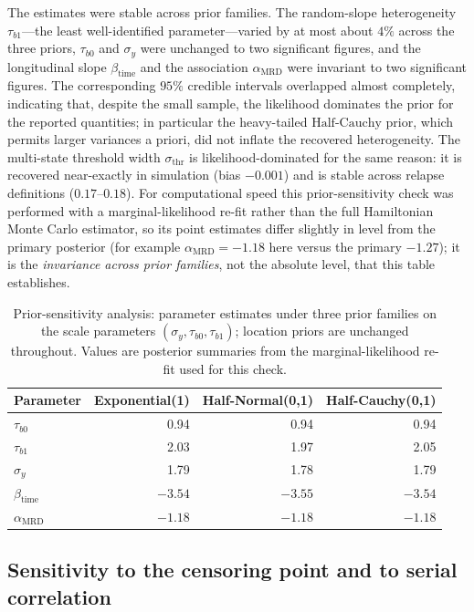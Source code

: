 \documentclass[11pt]{article}
\begin{document}
The estimates were stable across prior families. The random-slope heterogeneity
$\tau_{b1}$---the least well-identified parameter---varied by at most about
$4\%$ across the three priors, $\tau_{b0}$ and $\sigma_y$ were unchanged to two
significant figures, and the longitudinal slope $\beta_{\mathrm{time}}$ and the
association $\alpha_{\mathrm{MRD}}$ were invariant to two significant figures.
The corresponding $95\%$ credible intervals overlapped almost completely,
indicating that, despite the small sample, the likelihood dominates the prior
for the reported quantities; in particular the heavy-tailed
$\mathrm{Half\text{-}Cauchy}$ prior, which permits larger variances a priori,
did not inflate the recovered heterogeneity. The multi-state threshold width
$\sigma_{\mathrm{thr}}$ is likelihood-dominated for the same reason: it is
recovered near-exactly in simulation (bias $-0.001$) and is stable across
relapse definitions ($0.17$--$0.18$). For computational speed this prior-sensitivity
check was performed with a marginal-likelihood re-fit rather than the full
Hamiltonian Monte Carlo estimator, so its point estimates differ slightly in level
from the primary posterior (for example $\alpha_{\mathrm{MRD}}=-1.18$ here versus the
primary $-1.27$); it is the \emph{invariance across prior families}, not the absolute
level, that this table establishes.

\begin{table}[!htbp]
\centering
\caption{Prior-sensitivity analysis: parameter estimates under three prior
families on the scale parameters $(\sigma_y,\tau_{b0},\tau_{b1})$; location
priors are unchanged throughout. Values are posterior summaries from the
marginal-likelihood re-fit used for this check.}
\label{tab:prior-sensitivity}
\small
\begin{tabular}{lrrr}
\toprule
Parameter & Exponential(1) & Half-Normal(0,1) & Half-Cauchy(0,1)\\
\midrule
$\tau_{b0}$              & 0.94 & 0.94 & 0.94\\
$\tau_{b1}$              & 2.03 & 1.97 & 2.05\\
$\sigma_y$               & 1.79 & 1.78 & 1.79\\
$\beta_{\mathrm{time}}$  & $-3.54$ & $-3.55$ & $-3.54$\\
$\alpha_{\mathrm{MRD}}$  & $-1.18$ & $-1.18$ & $-1.18$\\
\bottomrule
\end{tabular}
\end{table}

\subsection{Sensitivity to the censoring point and to serial correlation}
\label{sec:sens-extra}
\end{document}
